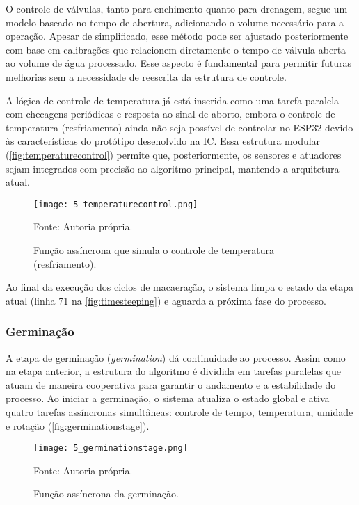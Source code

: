 O controle de válvulas, tanto para enchimento quanto para drenagem, segue um modelo baseado no tempo de abertura, adicionando o volume necessário para a operação. Apesar de simplificado, esse método pode ser ajustado posteriormente com base em calibrações que relacionem diretamente o tempo de válvula aberta ao volume de água processado. Esse aspecto é fundamental para permitir futuras melhorias sem a necessidade de reescrita da estrutura de controle.

A lógica de controle de temperatura já está inserida como uma tarefa paralela com checagens periódicas e resposta ao sinal de aborto, embora o controle de temperatura (resfriamento) ainda não seja possível de controlar no ESP32 devido às características do protótipo desenolvido na IC. Essa estrutura modular (\autoref{fig:temperaturecontrol}) permite que, posteriormente, os sensores e atuadores sejam integrados com precisão ao algoritmo principal, mantendo a arquitetura atual.

\begin{figure}[ht]
    \centering
    \caption{Função assíncrona que simula o controle de temperatura (resfriamento).}
    \label{fig:temperaturecontrol}
    \texttt{[image: 5\_temperaturecontrol.png]}

    {\centering\footnotesize Fonte: Autoria própria.\par}
\end{figure}

Ao final da execução dos ciclos de macaeração, o sistema limpa o estado da etapa atual (linha 71 na \autoref{fig:timesteeping}) e aguarda a próxima fase do processo.

\subsubsection{Germinação}

A etapa de germinação (\textit{germination}) dá continuidade ao processo. Assim como na etapa anterior, a estrutura do algoritmo é dividida em tarefas paralelas que atuam de maneira cooperativa para garantir o andamento e a estabilidade do processo. Ao iniciar a germinação, o sistema atualiza o estado global e ativa quatro tarefas assíncronas simultâneas: controle de tempo, temperatura, umidade e rotação (\autoref{fig:germinationstage}).

\begin{figure}[ht]
    \centering
    \caption{Função assíncrona da germinação.}
    \label{fig:germinationstage}
    \texttt{[image: 5\_germinationstage.png]}

    {\centering\footnotesize Fonte: Autoria própria.\par}
\end{figure}

